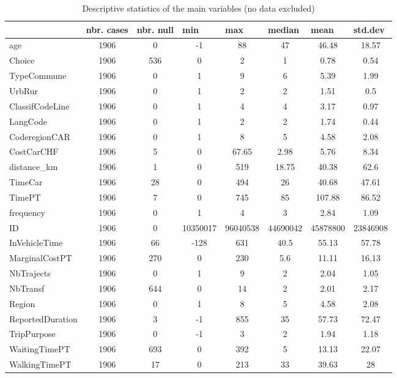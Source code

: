 \documentclass[12pt,a4paper]{article}
\begin{document}
\begin{sidewaystable}[htbp]
\caption{\label{tab8} Descriptive statistics of the main variables (no data excluded) }
\vspace{0.2cm}
\begin{tabular}{||l|c|c|c|c|c|c|c||}
\hline
 & \multicolumn{1}{l|}{nbr. cases} & \multicolumn{1}{l|}{nbr. null} & \multicolumn{1}{l|}{min} & \multicolumn{1}{l|}{max} & \multicolumn{1}{l|}{median} & \multicolumn{1}{l|}{mean} & \multicolumn{1}{l|}{std.dev} \\ \hline
age & 1906 & 0 & -1 & 88 & 47 & 46.48 & 18.57 \\ \hline
Choice & 1906 & 536 & 0 & 2 & 1 & 0.78 & 0.54 \\ \hline
TypeCommune & 1906 & 0 & 1 & 9 & 6 & 5.39 & 1.99 \\ \hline
UrbRur & 1906 & 0 & 1 & 2 & 2 & 1.51 & 0.5 \\ \hline
ClassifCodeLine & 1906 & 0 & 1 & 4 & 4 & 3.17 & 0.97 \\ \hline
LangCode & 1906 & 0 & 1 & 2 & 2 & 1.74 & 0.44 \\ \hline
CoderegionCAR & 1906 & 0 & 1 & 8 & 5 & 4.58 & 2.08 \\ \hline
CostCarCHF & 1906 & 5 & 0 & 67.65 & 2.98 & 5.76 & 8.34 \\ \hline
distance\_km & 1906 & 1 & 0 & 519 & 18.75 & 40.38 & 62.6 \\ \hline
TimeCar & 1906 & 28 & 0 & 494 & 26 & 40.68 & 47.61 \\ \hline
TimePT & 1906 & 7 & 0 & 745 & 85 & 107.88 & 86.52 \\ \hline
frequency & 1906 & 0 & 1 & 4 & 3 & 2.84 & 1.09 \\ \hline
ID & 1906 & 0 & 10350017 & 96040538 & 44690042 & 45878800 & 23846908 \\ \hline
InVehicleTime & 1906 & 66 & -128 & 631 & 40.5 & 55.13 & 57.78 \\ \hline
MarginalCostPT & 1906 & 270 & 0 & 230 & 5.6 & 11.11 & 16.13 \\ \hline
NbTrajects & 1906 & 0 & 1 & 9 & 2 & 2.04 & 1.05 \\ \hline
NbTransf & 1906 & 644 & 0 & 14 & 2 & 2.01 & 2.17 \\ \hline
Region & 1906 & 0 & 1 & 8 & 5 & 4.58 & 2.08 \\ \hline
ReportedDuration & 1906 & 3 & -1 & 855 & 35 & 57.73 & 72.47 \\ \hline
TripPurpose & 1906 & 0 & -1 & 3 & 2 & 1.94 & 1.18 \\ \hline
WaitingTimePT & 1906 & 693 & 0 & 392 & 5 & 13.13 & 22.07 \\ \hline
WalkingTimePT & 1906 & 17 & 0 & 213 & 33 & 39.63 & 28 \\ \hline
\end{tabular}
\end{sidewaystable}
\end{document}

